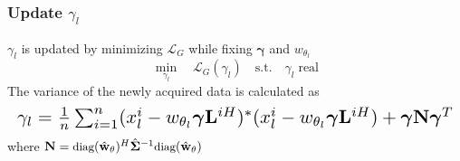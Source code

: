 \subsubsection*{Update $\gamma_{l}$}
$\gamma_{l}$ is updated by minimizing $\mathcal{L}_G$ while fixing $\boldsymbol{\gamma}$ and $w_{\theta_l}$
\vspace{-10pt} 
\begin{equation}
\min_{\gamma_{l}} \quad  \mathcal{L}_G(\gamma_{l}) \quad 
\text{s.t.} \quad  \gamma_{l} \; \text{real}
\end{equation} 
\vspace{-5pt} 
The variance of the newly acquired data is calculated as
\begin{equation}
\label{Equation:gamma_scalar}
\resizebox{\columnwidth}{!}{$
\small \gamma_l = \small \frac{1}{n} \sum_{i=1}^{n} (x_{l}^i - w_{\theta_{l}} \boldsymbol{\gamma} \mathbf{L}^{iH})^*(x_{l}^i - w_{\theta_{l}} \boldsymbol{\gamma} \mathbf{L}^{iH}) \\
    +  \boldsymbol{\gamma} \mathbf{N} \boldsymbol{\gamma}^T 
$}
\end{equation}
\vspace{-10pt} 
where $\small \mathbf{N} = \small \text{diag}(\hat{\mathbf{w}}_{\theta})^H \hat{\mathbf{\Sigma}}^{-1} \text{diag}(\hat{\mathbf{w}}_{\theta})$
